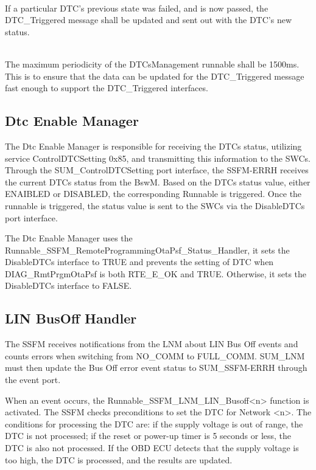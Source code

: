 \\
If a particular DTC’s previous state was failed, and is now passed, the DTC_Triggered message shall be updated and sent out with the DTC’s new status.
{}

\\
The maximum periodicity of the DTCsManagement runnable shall be 1500ms. This is to ensure that the data can be updated for the DTC_Triggered message fast enough to support the DTC_Triggered interfaces.
{ }

\subsection{Dtc Enable Manager}
\label{subsec:DTCEnableManager1}

The Dtc Enable Manager is responsible for receiving the DTCs status, utilizing service ControlDTCSetting 0x85, and transmitting this information to the SWCs.
\\Through the SUM_ControlDTCSetting port interface, the SSFM-ERRH receives the current DTCs status from the BswM. Based on the DTCs status value, either ENAIBLED or DISABLED,
the corresponding Runnable is triggered. Once the runnable is triggered, the status value is sent to the SWCs via the DisableDTCs port interface. 

The Dtc Enable Manager uses the Runnable_SSFM_RemoteProgrammingOtaPsf_Status_Handler, it sets the DisableDTCs interface to TRUE and prevents the setting of DTC when DIAG_RmtPrgmOtaPsf is both RTE_E_OK and TRUE. Otherwise, it sets the DisableDTCs interface to FALSE.


{   }


\subsection{LIN BusOff Handler}
\label{subsec:LIN BusOff Handler}

The SSFM receives notifications from the LNM about LIN Bus Off events and counts errors when switching from NO_COMM to FULL_COMM. 
SUM_LNM must then update the Bus Off error event status to SUM_SSFM-ERRH through the event port.

When an event occurs, the Runnable_SSFM_LNM_LIN_Busoff<n> function is activated. The SSFM checks preconditions to set the DTC for Network <n>. 
The conditions for processing the DTC are: if the supply voltage is out of range, the DTC is not processed; 
if the reset or power-up timer is 5 seconds or less, the DTC is also not processed. 
If the OBD ECU detects that the supply voltage is too high, the DTC is processed, and the results are updated.

